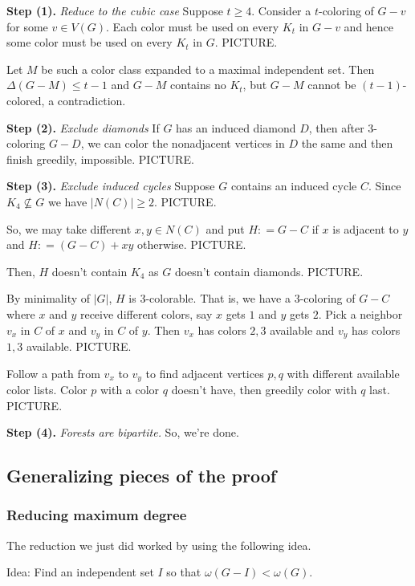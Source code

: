 \documentclass[12pt]{article}
\theoremstyle{plain}
\theoremstyle{definition}
\theoremstyle{remark}
\newcommand{\card}[1]{\left|#1\right|}
\newcommand{\DefinedAs}{\mathrel{\mathop:}=}
\begin{document}
\textbf{Step (1).} \textit{Reduce to the cubic case}
Suppose $t \geq 4$. Consider a $t$-coloring of $G-v$ for some $v \in V(G)$.  Each color must be used on every $K_t$ in $G-v$ and hence some color must be used on every $K_t$ in $G$.  PICTURE.  

Let $M$ be such a color class expanded to a maximal independent set.  Then $\Delta(G-M) \leq t-1$ and $G-M$ contains no $K_t$, but $G-M$ cannot be $(t-1)$-colored, a contradiction.

\textbf{Step (2).} \textit{Exclude diamonds}
If $G$ has an induced diamond $D$, then after $3$-coloring $G-D$, we can color the nonadjacent vertices in $D$ the same and then finish greedily, impossible.  PICTURE.

\textbf{Step (3).} \textit{Exclude induced cycles}
Suppose $G$ contains an induced cycle $C$.   Since $K_4 \not \subseteq G$ we have $\card{N(C)} \geq 2$. PICTURE.

So, we may take different $x, y \in N(C)$ and put $H \DefinedAs G - C$ if $x$ is adjacent to $y$ and $H \DefinedAs (G-C) + xy$ otherwise.  PICTURE.

Then, $H$ doesn't contain $K_4$ as $G$ doesn't contain diamonds. PICTURE.

By minimality of $\card{G}$, $H$ is $3$-colorable. That is, we have a $3$-coloring of $G - C$ where $x$ and $y$ receive different colors, say $x$ gets $1$ and $y$ gets $2$.  Pick a neighbor $v_x$ in $C$ of $x$ and $v_y$ in $C$ of $y$.  Then $v_x$ has colors $2, 3$ available and $v_y$ has colors $1,3$ available.  PICTURE.

Follow a path from $v_x$ to $v_y$ to find adjacent vertices $p, q$ with different available color lists.  Color $p$ with a color $q$ doesn't have, then greedily color with $q$ last. PICTURE.

\textbf{Step (4).} \textit{Forests are bipartite.}
So, we're done.

\subsection{Generalizing pieces of the proof}
\subsubsection{Reducing maximum degree}
The reduction we just did worked by using the following idea.

Idea:  Find an independent set $I$ so that $\omega(G-I) < \omega(G)$.

\bigskip
\end{document}
